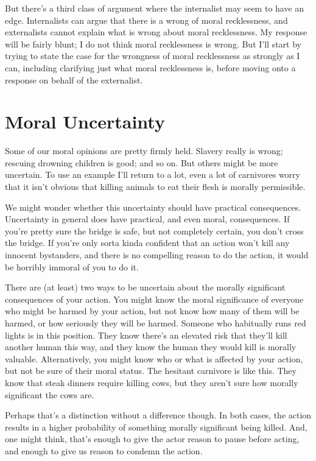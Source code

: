 \documentclass[
  10pt,
  letterpaper,
  DIV=11,
  numbers=noendperiod,
  twoside]{scrartcl}
\begin{document}
But there's a third class of argument where the internalist may seem to
have an edge. Internalists can argue that there is a wrong of moral
recklessness, and externalists cannot explain what is wrong about moral
recklessness. My response will be fairly blunt; I do not think moral
recklessness is wrong. But I'll start by trying to state the case for
the wrongness of moral recklessness as strongly as I can, including
clarifying just what moral recklessness is, before moving onto a
response on behalf of the externalist.

\section{Moral Uncertainty}\label{moraluncertainty}

Some of our moral opinions are pretty firmly held. Slavery really is
wrong; rescuing drowning children is good; and so on. But others might
be more uncertain. To use an example I'll return to a lot, even a lot of
carnivores worry that it isn't obvious that killing animals to eat their
flesh is morally permissible.

We might wonder whether this uncertainty should have practical
consequences. Uncertainty in general does have practical, and even
moral, consequences. If you're pretty sure the bridge is safe, but not
completely certain, you don't cross the bridge. If you're only sorta
kinda confident that an action won't kill any innocent bystanders, and
there is no compelling reason to do the action, it would be horribly
immoral of you to do it.

There are (at least) two ways to be uncertain about the morally
significant consequences of your action. You might know the moral
significance of everyone who might be harmed by your action, but not
know how many of them will be harmed, or how seriously they will be
harmed. Someone who habitually runs red lights is in this position. They
know there's an elevated risk that they'll kill another human this way,
and they know the human they would kill is morally valuable.
Alternatively, you might know who or what is affected by your action,
but not be sure of their moral status. The hesitant carnivore is like
this. They know that steak dinners require killing cows, but they aren't
sure how morally significant the cows are.

Perhaps that's a distinction without a difference though. In both cases,
the action results in a higher probability of something morally
significant being killed. And, one might think, that's enough to give
the actor reason to pause before acting, and enough to give us reason to
condemn the action.
\end{document}
